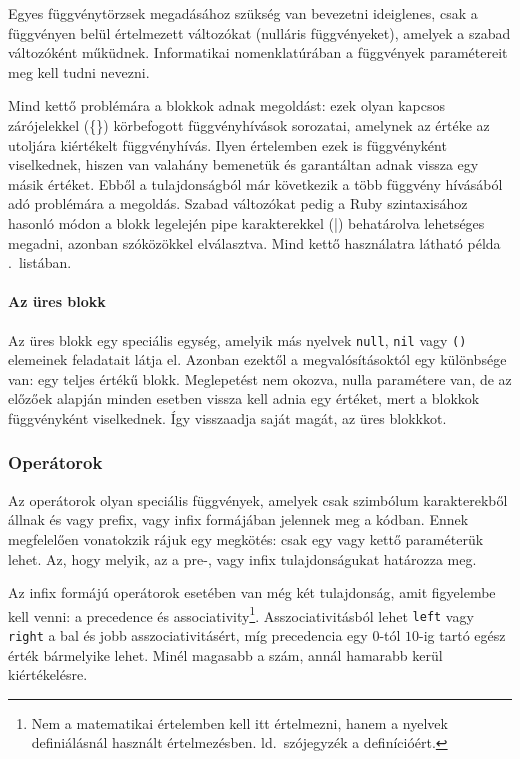 \documentclass[magyar,12pt,a4paper,final,titlepage]{report}
\def\inlcode#1{{\color{inline-code-color}\tt #1}}
\def\ld{ld.\ }
\begin{document}
    Egyes függvénytörzsek megadásához szükség van bevezetni ideiglenes, csak a függvényen belül értelmezett változókat (nulláris függvényeket), amelyek a szabad változóként műküdnek.
    Informatikai nomenklatúrában a függvények paramétereit meg kell tudni nevezni.

    Mind kettő problémára a blokkok adnak megoldást: ezek olyan kapcsos zárójelekkel (\{\}) körbefogott függvényhívások sorozatai, amelynek az értéke az utoljára kiértékelt függvényhívás.
    Ilyen értelemben ezek is függvényként viselkednek, hiszen van valahány bemenetük és garantáltan adnak vissza egy másik értéket.
    Ebből a tulajdonságból már következik a több függvény hívásából adó problémára a megoldás.
    Szabad változókat pedig a Ruby szintaxisához hasonló módon a blokk legelején pipe karakterekkel (|) behatárolva lehetséges megadni, azonban szóközökkel elválasztva.
    Mind kettő használatra látható példa .~listában.

    \paragraph{Az üres blokk}
    Az üres blokk egy speciális egység, amelyik más nyelvek \inlcode{null}, \inlcode{nil} vagy {\tt ()} elemeinek feladatait látja el.
    Azonban ezektől a megvalósításoktól egy különbsége van: egy teljes értékű blokk.
    Meglepetést nem okozva, nulla paramétere van, de az előzőek alapján minden esetben vissza kell adnia egy értéket, mert a blokkok függvényként viselkednek.
    Így visszaadja saját magát, az üres blokkkot.

    \subsubsection{Operátorok}

    Az operátorok olyan speciális függvények, amelyek csak szimbólum karakterekből állnak és vagy \gls{prefix}, vagy \gls{infix} formájában jelennek meg a kódban.
    Ennek megfelelően vonatokzik rájuk egy megkötés: csak egy vagy kettő paraméterük lehet.
    Az, hogy melyik, az a pre-, vagy infix tulajdonságukat határozza meg.

    Az \gls{infix} formájú operátorok esetében van még két tulajdonság, amit figyelembe kell venni: a \gls{precedence} és \gls{associativity}\footnote{Nem a matematikai értelemben kell itt értelmezni, hanem a nyelvek definiálásnál használt értelmezésben. \ld szójegyzék a definícióért.}.
    Asszociativitásból lehet \inlcode{left} vagy \inlcode{right} a bal és jobb asszociativitásért, míg precedencia egy $0$-tól $10$-ig tartó egész érték bármelyike lehet.
    Minél magasabb a szám, annál hamarabb kerül kiértékelésre.
\end{document}
